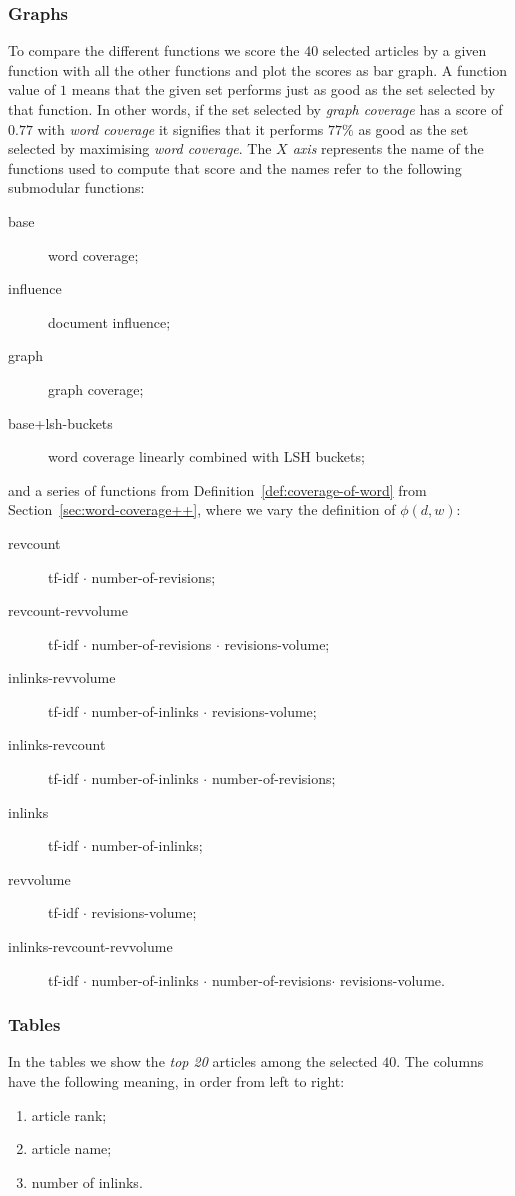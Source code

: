 \subsubsection{Graphs}
To compare the different functions we score the \(40\) selected articles by a
given function with all the other functions and plot the scores as bar graph.
A function value of \(1\) means that the given set performs just as good as the
set selected by that function.
In other words, if the set selected by \emph{graph coverage} has a score of
\(0.77\) with \emph{word coverage} it signifies that it performs \(77\%\) as
good as the set selected by maximising \emph{word coverage}.
The \emph{\(X\) axis} represents the name of the functions used to compute that
score and the names refer to the following submodular functions:
\begin{description}
  \item[base] word coverage;
  \item[influence] document influence;
  \item[graph] graph coverage;
  \item[base+lsh-buckets] word coverage linearly combined with LSH buckets;
\end{description}
and a series of functions from Definition~\ref{def:coverage-of-word} from
Section~\vref{sec:word-coverage++}, where we vary the definition of \(\phi(d,
w)\):
\begin{description}
  \item[revcount] tf-idf \(\cdot\) number-of-revisions;
  \item[revcount-revvolume] tf-idf \(\cdot\) number-of-revisions \(\cdot\)
  revisions-volume;
  \item[inlinks-revvolume] tf-idf \(\cdot\) number-of-inlinks \(\cdot\)
  revisions-volume;
  \item[inlinks-revcount] tf-idf \(\cdot\) number-of-inlinks \(\cdot\)
  number-of-revisions;
  \item[inlinks] tf-idf \(\cdot\) number-of-inlinks;
  \item[revvolume] tf-idf \(\cdot\) revisions-volume;
  \item[inlinks-revcount-revvolume] tf-idf \(\cdot\) number-of-inlinks
  \(\cdot\) number-of-revisions\(\cdot\) revisions-volume.
\end{description}

\subsubsection{Tables}
In the tables we show the \emph{top 20} articles among the selected \(40\).
The columns have the following meaning, in order from left to right:
\begin{enumerate}
  \item article rank;
  \item article name;
  \item number of inlinks.
\end{enumerate}

